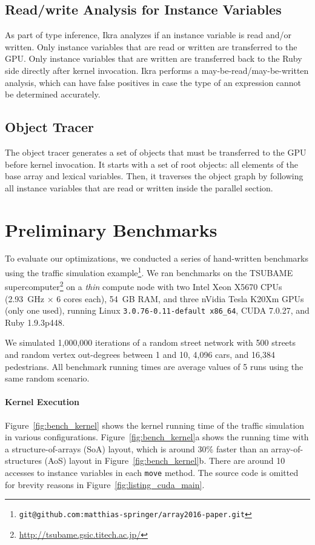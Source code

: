 \documentclass[preprint]{sigplanconf}
\begin{document}
\subsection{Read/write Analysis for Instance Variables}
\label{sec:impl_copyback}
As part of type inference, Ikra analyzes if an instance variable is read and/or written. Only instance variables that are read or written are transferred to the GPU. Only instance variables that are written are transferred back to the Ruby side directly after kernel invocation. Ikra performs a may-be-read/may-be-written analysis, which can have false positives in case the type of an expression cannot be determined accurately.

\subsection{Object Tracer}
\label{sec:impl_tracer}
The object tracer generates a set of objects that must be transferred to the GPU before kernel invocation. It starts with a set of root objects: all elements of the base array and lexical variables. Then, it traverses the object graph by following all instance variables that are read or written inside the parallel section. 

\section{Preliminary Benchmarks}
To evaluate our optimizations, we conducted a series of hand-written benchmarks using the traffic simulation example\footnote{\texttt{git@github.com:matthias-springer/array2016-paper.git}}. We ran benchmarks on the TSUBAME supercomputer\footnote{\url{http://tsubame.gsic.titech.ac.jp/}} on a \emph{thin} compute node with two Intel Xeon X5670 CPUs (2.93~GHz $\times$ 6 cores each), 54~GB RAM, and three nVidia Tesla K20Xm GPUs (only one used), running Linux \texttt{3.0.76-0.11-default x86\_64}, CUDA 7.0.27, and Ruby 1.9.3p448.

We simulated 1,000,000 iterations of a random street network with 500 streets and random vertex out-degrees between 1 and 10, 4,096 cars, and 16,384 pedestrians. All benchmark running times are average values of 5 runs using the same random scenario.

\paragraph{Kernel Execution}
Figure~\ref{fig:bench_kernel} shows the kernel running time of the traffic simulation in various configurations. Figure~\ref{fig:bench_kernel}a shows the running time with a structure-of-arrays (SoA) layout, which is around 30\% faster than an array-of-structures (AoS) layout in Figure~\ref{fig:bench_kernel}b. There are around 10 accesses to instance variables in each \texttt{move} method. The source code is omitted for brevity reasons in Figure~\ref{fig:listing_cuda_main}.
\end{document}
